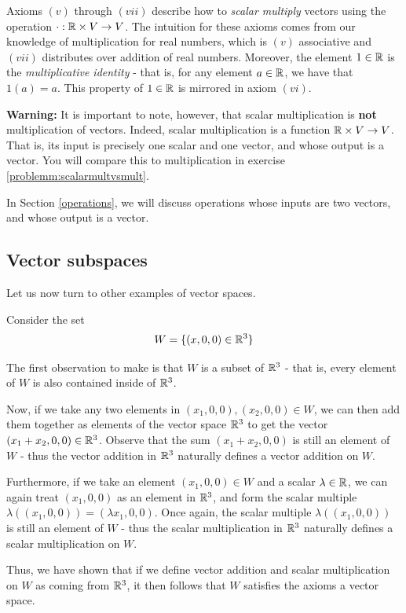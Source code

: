     Axioms $(v)$ through $(vii)$ describe how to \textit{scalar multiply} vectors using the operation $\cdot : \mathbb{R} \times V \to V$.  The intuition for these axioms comes from our knowledge of multiplication for real numbers, which is $(v)$ associative and $(vii)$ distributes over addition of real numbers.  Moreover, the element $1 \in \mathbb{R}$ is the \textit{multiplicative identity} - that is, for any element $a \in \mathbb{R}$, we have that $1(a) = a$.  This property of $1\in \mathbb{R}$ is mirrored in axiom $(vi)$.

    \begin{example}
    \textbf{Warning:} It is important to note, however, that scalar multiplication is \textbf{not} multiplication of vectors.  Indeed, scalar multiplication is a function $\mathbb{R} \times V \to V$.  That is, its input is precisely one scalar and one vector, and whose output is a vector.  You will compare this to multiplication in exercise \ref{problemm:scalarmultvsmult}.
    
    In Section \ref{operations}, we will discuss operations whose inputs are two vectors, and whose output is a vector.
    \end{example}
    
    \subsection{Vector subspaces}
    
    Let us now turn to other examples of vector spaces.
    
    \begin{example}
    Consider the set $$W = \{(x, 0, 0) \in \mathbb{R}^3 \}$$
    
    The first observation to make is that $W$ is a subset of $\mathbb{R}^3$ - that is, every element of $W$ is also contained inside of $\mathbb{R}^3$.  
    
    
    Now, if we take any two elements in $(x_1,0,0), (x_2,0,0) \in W$, we can then add them together as elements of the vector space $\mathbb{R}^3$ to get the vector $(x_1 + x_2, 0,0) \in \mathbb{R}^3$.  Observe that the sum $(x_1 + x_2, 0,0)$ is still an element of $W$ - thus the vector addition in $\mathbb{R}^3$ naturally defines a vector addition on $W$.
    
    Furthermore, if we take an element $(x_1,0,0) \in W$ and a scalar $\lambda \in \mathbb{R}$, we can again treat $(x_1,0,0)$ as an element in $\mathbb{R}^3$, and form the scalar multiple $\lambda((x_1,0,0)) = (\lambda x_1,0,0)$.  Once again, the scalar multiple $\lambda((x_1,0,0))$ is still an element of $W$ - thus the scalar multiplication in $\mathbb{R}^3$ naturally defines a scalar multiplication on $W$.
    
    Thus, we have shown that if we define vector addition and scalar multiplication on $W$ as coming from $\mathbb{R}^3$, it then follows that $W$ satisfies the axioms a vector space.
    \end{example}

